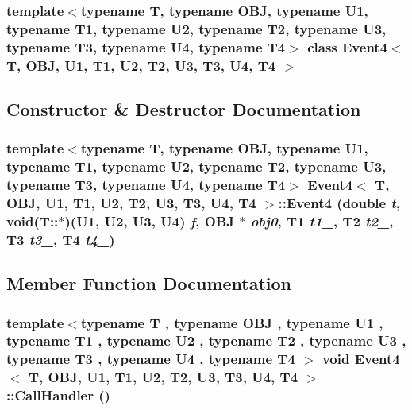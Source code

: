 \subsubsection*{template$<$typename T, typename OBJ, typename U1, typename T1, typename U2, typename T2, typename U3, typename T3, typename U4, typename T4$>$ class Event4$<$ T, OBJ, U1, T1, U2, T2, U3, T3, U4, T4 $>$}



\subsection{Constructor \& Destructor Documentation}
\hypertarget{classEvent4_44d546a1df3e3421086701d66b103e3c}{
\subsubsection[{Event4}]{\setlength{\rightskip}{0pt plus 5cm}template$<$typename T, typename OBJ, typename U1, typename T1, typename U2, typename T2, typename U3, typename T3, typename U4, typename T4$>$ {\bf Event4}$<$ T, OBJ, U1, T1, U2, T2, U3, T3, U4, T4 $>$::{\bf Event4} (double {\em t}, \/  void(T::$\ast$)(U1, U2, U3, U4) {\em f}, \/  OBJ $\ast$ {\em obj0}, \/  T1 {\em t1\_}, \/  T2 {\em t2\_}, \/  T3 {\em t3\_}, \/  T4 {\em t4\_})}}
\label{classEvent4_44d546a1df3e3421086701d66b103e3c}




\subsection{Member Function Documentation}
\hypertarget{classEvent4_69f98edf52e4f93f5cf0e0d5464f6ce0}{
\subsubsection[{CallHandler}]{\setlength{\rightskip}{0pt plus 5cm}template$<$typename T , typename OBJ , typename U1 , typename T1 , typename U2 , typename T2 , typename U3 , typename T3 , typename U4 , typename T4 $>$ void {\bf Event4}$<$ T, OBJ, U1, T1, U2, T2, U3, T3, U4, T4 $>$::CallHandler ()}}
\label{classEvent4_69f98edf52e4f93f5cf0e0d5464f6ce0}




